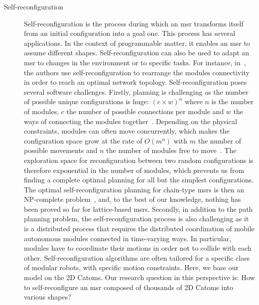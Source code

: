 \begin{description}
	\item[Self-reconfiguration] Self-reconfiguration is the process during which an \gls{msr} transforms itself from an initial configuration into a goal one. This process has several applications. In the context of programmable matter, it enables an \gls{msr} to assume different shapes. Self-reconfiguration can also be used to adapt an \gls{msr} to changes in the environment or to specific tasks. For instance, in~\cite{lakhlef2013distributed}, the authors use self-reconfiguration to rearrange the modules connectivity in order to reach an optimal network topology. Self-reconfiguration poses several software challenges. Firstly, planning is challenging as the number of possible unique configurations is huge: $(c \times w)^n$ where $n$ is the number of modules, $c$ the number of possible connections per module and $w$ the ways of connecting the modules together~\cite{yimReconf}. Depending on the physical constraints, modules can often move concurrently, which makes the configuration space grow at the rate of $O(m^n)$ with $m$ the number of possible movements and $n$ the number of modules free to move~\cite{latombe91}. The exploration space for reconfiguration between two random configurations is therefore exponential in the number of modules, which prevents us from finding a complete optimal planning for all but the simplest configurations. The optimal self-reconfiguration planning for chain-type \gls{msr}s is then an NP-complete problem~\cite{Hou2014}, and, to the best of our knowledge, nothing has been proved so far for lattice-based \gls{msr}s. Secondly, in addition to the path planning problem, the self-reconfiguration process is also challenging as it is a distributed process that requires the distributed coordination of mobile autonomous modules connected in time-varying ways. In particular, modules have to coordinate their motions in order not to collide with each other. Self-reconfiguration algorithms are often tailored for a specific class of modular robots, with specific motion constraints. Here, we base our model on the 2D Catoms. Our research question in this perspective is: How to self-reconfigure an \gls{msr} composed of thousands of 2D Catoms into various shapes?
		

\end{description}
